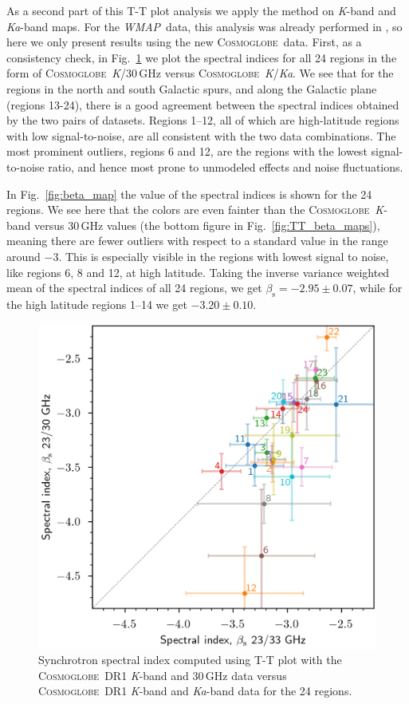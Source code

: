 \documentclass[twocolumn]{../../common/aa}
\def\wmap{\emph{WMAP}}
\newcommand{\cosmoglobe}{\textsc{Cosmoglobe}}
\newcommand{\Cosmoglobe}{\textsc{Cosmoglobe}}
\newcommand{\K}[0]{\textit K}
\newcommand{\Ka}[0]{\textit{Ka}}
\begin{document}
As a second part of this T-T plot analysis we apply the method on \K-band and \Ka-band maps. For the \wmap\ data, this analysis was already performed in  \citet{fuskeland2014}, so here we only present results using the new \cosmoglobe\ data. First, as a consistency check, in Fig.~\ref{fig:cos30_xyplot} we plot the spectral indices for all 24 regions in the form of \cosmoglobe\ \K/30\,GHz versus \cosmoglobe\ \K/\Ka. We see that for the regions in the north and south Galactic spurs, and along the Galactic plane (regions 13-24), there is a good agreement between the spectral indices obtained by the two pairs of datasets. Regions 1--12, all of which are high-latitude regions with low signal-to-noise, are all consistent with the two data combinations. The most prominent outliers, regions 6 and 12, are the regions with the lowest signal-to-noise ratio, and hence most prone to unmodeled effects and noise fluctuations.

In Fig.~\ref{fig:beta_map} the value of the spectral indices is shown for the 24 regions. We see here that the colors are even fainter than the \cosmoglobe\ \K-band versus 30\,GHz values (the bottom figure in Fig.~\ref{fig:TT_beta_maps}), meaning there are fewer outliers with respect to a standard value in the range around $-3$. This is especially visible in the regions with lowest signal to noise, like regions 6, 8 and 12, at high latitude. Taking the inverse variance weighted mean of the spectral indices of all 24 regions, we get $\beta_{\mathrm{s}}=-2.95\pm0.07$, while for the high latitude regions 1--14 we get $-3.20\pm0.10$.


\begin{figure}
        \centering
        \includegraphics[width=\linewidth]{figures/xy_regions.png}
        \caption{
Synchrotron spectral index computed using T-T plot with the \Cosmoglobe\ DR1 \K-band and 30\,GHz data versus \Cosmoglobe\ DR1 \K-band and \Ka-band data for the 24 regions.}
        \label{fig:cos30_xyplot}
\end{figure}
\end{document}
